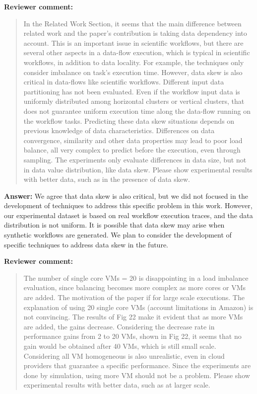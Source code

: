 \documentclass{letter}
\newenvironment{review}%
{\textbf{Reviewer comment:}\begin{quote}}%
{\end{quote}}%
\newcommand{\answer}[1]{%
      \textbf{Answer:} #1}
\begin{document}
\begin{letter}{}
\begin{review}
In the Related Work Section, it seems that the main difference between related work and the paper's contribution is taking data dependency into account. This is an important issue in scientific workflows, but there are several other aspects in a data-flow execution, which is typical in scientific workflows, in addition to data locality. For example, the techniques only consider imbalance on task's execution time. However, data skew is also critical in data-flows like scientific workflows. Different input data partitioning has not been evaluated. Even if the workflow input data is uniformly distributed among horizontal clusters or vertical clusters, that does not guarantee uniform execution time along the data-flow running on the workflow tasks. Predicting these data skew situations depends on previous knowledge of data characteristics. Differences on data convergence, similarity and other data properties may lead to poor load balance, all very complex to predict before the execution, even through sampling. The experiments only evaluate differences in data size, but not in data value distribution, like data skew. Please show experimental results with better data, such as in the presence of data skew.
\end{review}

\answer{We agree that data skew is also critical, but we did not focused in the development of techniques to address this specific problem in this work. However, our experimental dataset is based on real workflow execution traces, and the data distribution is not uniform. It is possible that data skew may arise when synthetic workflows are generated. We plan to consider the development of specific techniques to address data skew in the future.}


\begin{review}
The number of single core VMs = 20 is disappointing in a load imbalance evaluation, since balancing becomes more complex as more cores or VMs are added. The motivation of the paper if for large scale executions. The explanation of using 20 single core VMs (account limitations in Amazon) is not convincing. The results of Fig 22 make it evident that as more VMs are added, the gains decrease. Considering the decrease rate in performance gains from 2 to 20 VMs, shown in Fig 22, it seems that no gain would be obtained after 40 VMs, which is still small scale. Considering all VM homogeneous is also unrealistic, even in cloud providers that guarantee a specific performance. Since the experiments are done by simulation, using more VM should not be a problem. Please show experimental results with better data, such as at larger scale. 
\end{review}


\end{letter}
\end{document}
